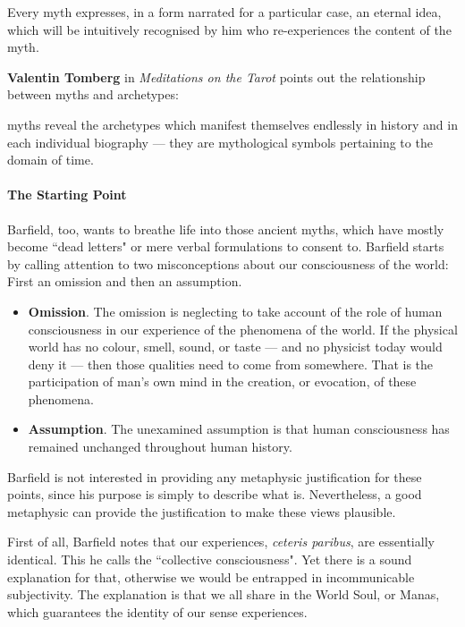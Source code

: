 \begin{quotex}
Every myth expresses, in a form narrated for a particular case, an eternal idea, which will be intuitively recognised by him who re-experiences the content of the myth. 

\end{quotex}
\textbf{Valentin Tomberg} in \emph{Meditations on the Tarot}  points out the relationship between myths and archetypes:

\begin{quotex}
myths reveal the archetypes which manifest themselves endlessly in history and in each individual biography — they are mythological symbols pertaining to the domain of time.

\end{quotex}
\paragraph{The Starting Point}
Barfield, too, wants to breathe life into those ancient myths, which have mostly become ``dead letters" or mere verbal formulations to consent to. Barfield starts by calling attention to two misconceptions about our consciousness of the world: First an omission and then an assumption.

\begin{itemize}
\item \textbf{Omission}. The omission is neglecting to take account of the role of human consciousness in our experience of the phenomena of the world. If the physical world has no colour, smell, sound, or taste — and no physicist today would deny it — then those qualities need to come from somewhere. That is the participation of man's own mind in the creation, or evocation, of these phenomena. 
\item \textbf{Assumption}. The unexamined assumption is that human consciousness has remained unchanged throughout human history. 
\end{itemize}
Barfield is not interested in providing any metaphysic justification for these points, since his purpose is simply to describe what is. Nevertheless, a good metaphysic can provide the justification to make these views plausible.

First of all, Barfield notes that our experiences, \emph{ceteris paribus}, are essentially identical. This he calls the ``collective consciousness". Yet there is a sound explanation for that, otherwise we would be entrapped in incommunicable subjectivity. The explanation is that we all share in the World Soul, or Manas, which guarantees the identity of our sense experiences.


